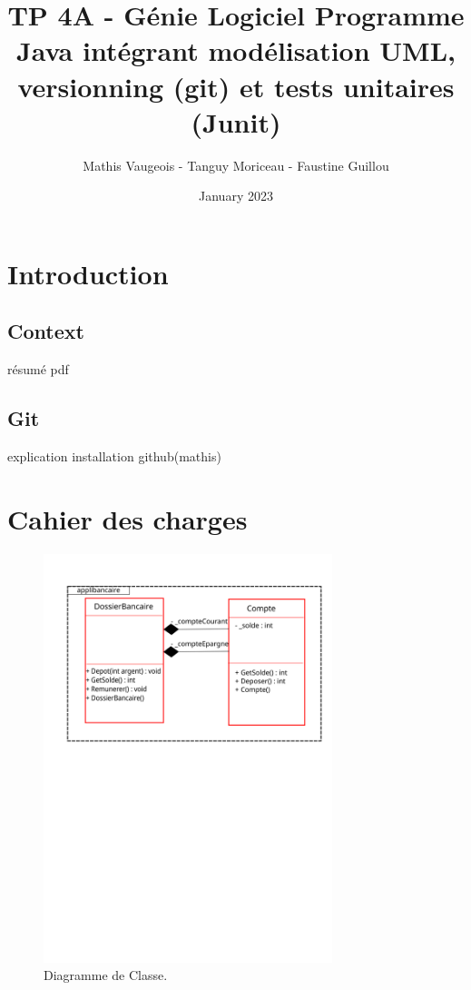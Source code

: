 \documentclass{article}
\title{TP 4A - Génie Logiciel
Programme Java intégrant modélisation UML, versionning (git)
et tests unitaires (Junit)
}
\author{Mathis Vaugeois - Tanguy Moriceau -  Faustine Guillou}
\date{January 2023}
\begin{document}
\maketitle
\tableofcontents

\newpage
\section{Introduction}

\subsection{Context}
résumé pdf
\subsection{Git}
explication installation github(mathis)
\newpage
\section{Cahier des charges}

\begin{figure}
    \centering
    \includegraphics[width=0.75\textwidth]{diagrammeClasse}
    \caption{Diagramme de Classe.}
    \label{fig:mesh1}
\end{figure}
\end{document}
